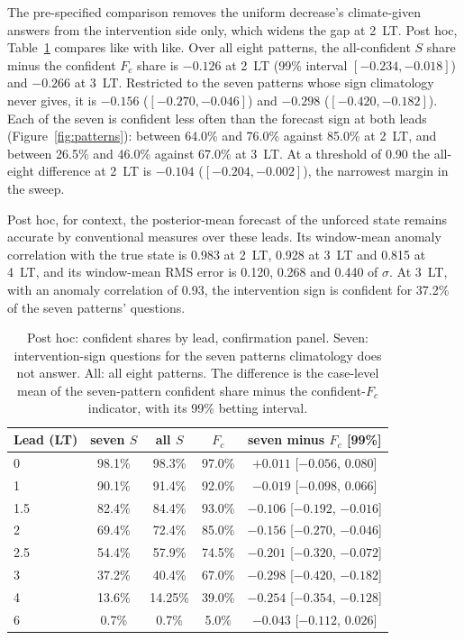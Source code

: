\documentclass[11pt]{article}
\begin{document}
The pre-specified comparison removes the uniform decrease's climate-given answers from the intervention side only, which widens the gap at 2~LT. Post hoc, Table~\ref{tab:seven} compares like with like. Over all eight patterns, the all-confident $S$ share minus the confident $F_c$ share is $-0.126$ at 2~LT (99\% interval $[-0.234, -0.018]$) and $-0.266$ at 3~LT. Restricted to the seven patterns whose sign climatology never gives, it is $-0.156$ ($[-0.270, -0.046]$) and $-0.298$ ($[-0.420, -0.182]$). Each of the seven is confident less often than the forecast sign at both leads (Figure~\ref{fig:patterns}): between 64.0\% and 76.0\% against 85.0\% at 2~LT, and between 26.5\% and 46.0\% against 67.0\% at 3~LT. At a threshold of 0.90 the all-eight difference at 2~LT is $-0.104$ ($[-0.204, -0.002]$), the narrowest margin in the sweep.

Post hoc, for context, the posterior-mean forecast of the unforced state remains accurate by conventional measures over these leads. Its window-mean anomaly correlation with the true state is 0.983 at 2~LT, 0.928 at 3~LT and 0.815 at 4~LT, and its window-mean RMS error is 0.120, 0.268 and 0.440 of $\sigma$. At 3~LT, with an anomaly correlation of 0.93, the intervention sign is confident for 37.2\% of the seven patterns' questions.

\begin{table}[t]
\centering
\small
\caption{Post hoc: confident shares by lead, confirmation panel. Seven: intervention-sign questions for the seven patterns climatology does not answer. All: all eight patterns. The difference is the case-level mean of the seven-pattern confident share minus the confident-$F_c$ indicator, with its 99\% betting interval.}
\label{tab:seven}
\begin{tabular}{lcccc}
\toprule
Lead (LT) & seven $S$ & all $S$ & $F_c$ & seven minus $F_c$ [99\%] \\
\midrule
0   & 98.1\% & 98.3\% & 97.0\% & $+0.011$ [$-0.056$, $0.080$] \\
1   & 90.1\% & 91.4\% & 92.0\% & $-0.019$ [$-0.098$, $0.066$] \\
1.5 & 82.4\% & 84.4\% & 93.0\% & $-0.106$ [$-0.192$, $-0.016$] \\
2   & 69.4\% & 72.4\% & 85.0\% & $-0.156$ [$-0.270$, $-0.046$] \\
2.5 & 54.4\% & 57.9\% & 74.5\% & $-0.201$ [$-0.320$, $-0.072$] \\
3   & 37.2\% & 40.4\% & 67.0\% & $-0.298$ [$-0.420$, $-0.182$] \\
4   & 13.6\% & 14.25\% & 39.0\% & $-0.254$ [$-0.354$, $-0.128$] \\
6   & 0.7\% & 0.7\% & 5.0\% & $-0.043$ [$-0.112$, $0.026$] \\
\bottomrule
\end{tabular}
\end{table}
\end{document}
